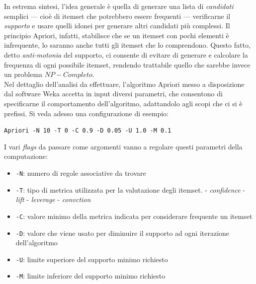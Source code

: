         In estrema sintesi, l'idea generale è quella di generare una lista di \textit{candidati} semplici --- cioè di itemset che potrebbero essere frequenti --- verificarne il \textit{supporto} e usare quelli idonei per generare altri candidati più complessi. Il principio Apriori, infatti, stabilisce che se un itemset con pochi elementi è infrequente, lo saranno anche tutti gli itemset che lo comprendono. Questo fatto, detto \textit{anti-motonia} del supporto, ci consente di evitare di generare e calcolare la frequenza di ogni possibile itemset, rendendo trattabile quello che sarebbe invece un problema $NP-Completo$. \\

        Nel dettaglio dell'analisi da effettuare, l'algoritmo Apriori messo a disposizione dal software Weka accetta in input diversi parametri, che consentono di specificarne il comportamento dell'algoritmo, adattandolo agli scopi che ci si è prefissi. Si veda adesso una configurazione di esempio:\\

        \begin{center}
            \noindent \texttt{Apriori -N 10 -T 0 -C 0.9 -D 0.05 -U 1.0 -M 0.1}
        \end{center}

        I vari \textit{flags} da passare come argomenti vanno a regolare questi parametri della computazione:

        \begin{itemize}
            \item \texttt{-N}: numero di regole associative da trovare
            \item \texttt{-T}: tipo di metrica utilizzata per la valutazione degli itemset.
                 - \textit{confidence}
                 - \textit{lift}
                 - \textit{leverage}
                 - \textit{convction}
            \item \texttt{-C}: valore minimo della metrica indicata per considerare frequente un itemset
            \item \texttt{-D}: valore che viene usato per diminuire il supporto ad ogni iterazione dell'algoritmo
            \item \texttt{-U}: limite superiore del supporto minimo richiesto
            \item \texttt{-M}: limite inferiore del supporto minimo richiesto 
        \end{itemize}


